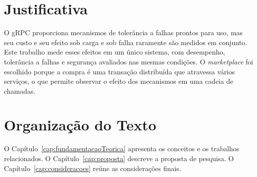 \section{Justificativa}

O gRPC proporciona mecanismos de tolerância a falhas prontos para uso, mas seu custo e seu efeito
sob carga e sob falha raramente são medidos em conjunto. Este trabalho mede esses efeitos em um
único sistema, com desempenho, tolerância a falhas e segurança avaliados nas mesmas condições. O
\textit{marketplace} foi escolhido porque a compra é uma transação distribuída que atravessa vários
serviços, o que permite observar o efeito dos mecanismos em uma cadeia de chamadas.

\section{Organização do Texto}

O Capítulo~\ref{cap:fundamentacaoTeorica} apresenta os conceitos e os trabalhos relacionados. O
Capítulo~\ref{cap:proposta} descreve a proposta de pesquisa. O Capítulo~\ref{cap:consideracoes}
reúne as considerações finais.

